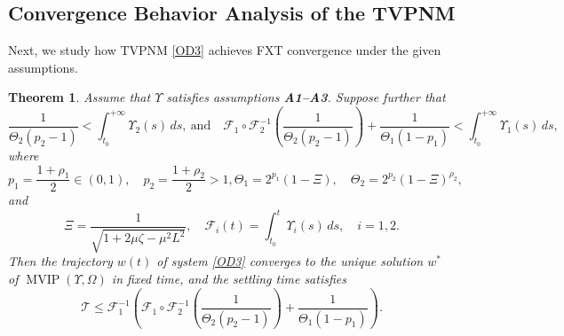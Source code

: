 \documentclass{article}
\theoremstyle{plain}%
\newtheorem{theorem}{Theorem}[section]
\theoremstyle{thmstyletwo}%
\theoremstyle{thmstylethree}%
\begin{document}
\subsection{Convergence Behavior Analysis of the TVPNM}
Next, we study how TVPNM \eqref{OD3} achieves FXT convergence under the given assumptions.\\
\begin{theorem}\label{thmFT}
Assume that $\Upsilon$ satisfies assumptions \textbf{A1--A3}.
Suppose further that
\[
\frac{1}{\Theta_2(p_2-1)} < \int_{t_0}^{+\infty} \Upsilon_2(s)\,ds,\ \text{and} \quad \mathcal{F}_1\circ \mathcal{F}_2^{-1}
\!\left(\frac{1}{\Theta_2(p_2-1)}\right)
+\frac{1}{\Theta_1(1-p_1)}
<
\int_{t_0}^{+\infty} \Upsilon_1(s)\,ds,\]
where
\[
p_1=\frac{1+\rho_1}{2}\in(0,1),\quad
p_2=\frac{1+\rho_2}{2}>1,\Theta_1 =2^{p_1}(1- \Xi),\quad
\Theta_2 =2^{p_2}(1- \Xi)^{\rho_2},
\]
and
\[\Xi=\frac{1}{\sqrt{1+2\mu\zeta-\mu^2L^2}},\quad\mathcal{F}_i(t)=\int_{t_0}^t \Upsilon_i(s)\,ds,\quad i=1,2.
\]
Then the trajectory $w(t)$ of system \eqref{OD3} converges to the unique solution
$w^*$ of $\operatorname{MVIP}(\Upsilon,\Omega)$ in fixed time, and the settling time
satisfies
\begin{equation}\label{eqtime}
\mathcal{T} \le
\mathcal{F}_1^{-1}
\!\left(
\mathcal{F}_1\circ \mathcal{F}_2^{-1}
\!\left(\frac{1}{\Theta_2(p_2-1)}\right)
+\frac{1}{\Theta_1(1-p_1)}
\right).
\end{equation}
\end{theorem}
\end{document}
